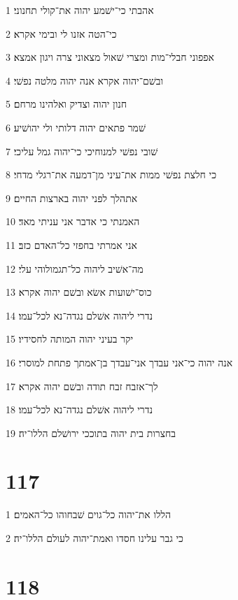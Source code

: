 \par 1 אהבתי כי־ישׁמע יהוה את־קולי תחנוני׃
\par 2 כי־הטה אזנו לי ובימי אקרא׃
\par 3 אפפוני חבלי־מות ומצרי שׁאול מצאוני צרה ויגון אמצא׃
\par 4 ובשׁם־יהוה אקרא אנה יהוה מלטה נפשׁי׃
\par 5 חנון יהוה וצדיק ואלהינו מרחם׃
\par 6 שׁמר פתאים יהוה דלותי ולי יהושׁיע׃
\par 7 שׁובי נפשׁי למנוחיכי כי־יהוה גמל עליכי׃
\par 8 כי חלצת נפשׁי ממות את־עיני מן־דמעה את־רגלי מדחי׃
\par 9 אתהלך לפני יהוה בארצות החיים׃
\par 10 האמנתי כי אדבר אני עניתי מאד׃
\par 11 אני אמרתי בחפזי כל־האדם כזב׃
\par 12 מה־אשׁיב ליהוה כל־תגמולוהי עלי׃
\par 13 כוס־ישׁועות אשׂא ובשׁם יהוה אקרא׃
\par 14 נדרי ליהוה אשׁלם נגדה־נא לכל־עמו׃
\par 15 יקר בעיני יהוה המותה לחסידיו׃
\par 16 אנה יהוה כי־אני עבדך אני־עבדך בן־אמתך פתחת למוסרי׃
\par 17 לך־אזבח זבח תודה ובשׁם יהוה אקרא׃
\par 18 נדרי ליהוה אשׁלם נגדה־נא לכל־עמו׃
\par 19 בחצרות בית יהוה בתוככי ירושׁלם הללו־יה׃

\chapter{117}

\par 1 הללו את־יהוה כל־גוים שׁבחוהו כל־האמים׃
\par 2 כי גבר עלינו חסדו ואמת־יהוה לעולם הללו־יה׃

\chapter{118}

